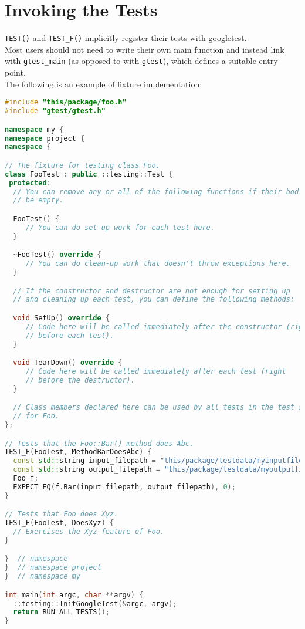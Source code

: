 \documentclass[letterpaper,11pt]{report}
\begin{document}
\section*{Invoking the Tests}
\texttt{TEST()} and \texttt{TEST\_F()} implicitly register their tests with googletest.\\
Most users should not need to write their own main function and instead link with \texttt{gtest\_main} (as 
opposed to with \texttt{gtest}), which defines a suitable entry point.\\
The following is an example of fixture implementation:
\begin{lstlisting}[language=C++]
#include "this/package/foo.h"
#include "gtest/gtest.h"

namespace my {
namespace project {
namespace {

// The fixture for testing class Foo.
class FooTest : public ::testing::Test {
 protected:
  // You can remove any or all of the following functions if their bodies would
  // be empty.

  FooTest() {
     // You can do set-up work for each test here.
  }

  ~FooTest() override {
     // You can do clean-up work that doesn't throw exceptions here.
  }

  // If the constructor and destructor are not enough for setting up
  // and cleaning up each test, you can define the following methods:

  void SetUp() override {
     // Code here will be called immediately after the constructor (right
     // before each test).
  }

  void TearDown() override {
     // Code here will be called immediately after each test (right
     // before the destructor).
  }

  // Class members declared here can be used by all tests in the test suite
  // for Foo.
};

// Tests that the Foo::Bar() method does Abc.
TEST_F(FooTest, MethodBarDoesAbc) {
  const std::string input_filepath = "this/package/testdata/myinputfile.dat";
  const std::string output_filepath = "this/package/testdata/myoutputfile.dat";
  Foo f;
  EXPECT_EQ(f.Bar(input_filepath, output_filepath), 0);
}

// Tests that Foo does Xyz.
TEST_F(FooTest, DoesXyz) {
  // Exercises the Xyz feature of Foo.
}

}  // namespace
}  // namespace project
}  // namespace my

int main(int argc, char **argv) {
  ::testing::InitGoogleTest(&argc, argv);
  return RUN_ALL_TESTS();
}
\end{lstlisting}
\end{document}
